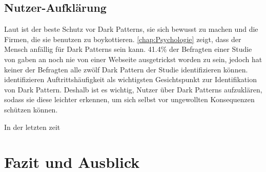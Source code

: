 \documentclass[conference,compsoc,final,a4paper]{IEEEtran}
\begin{document}
\subsection{Nutzer-Aufklärung}
Laut \citeauthor{Brignull} \autocite{Brignull} ist der beste Schutz vor Dark Patterns, sie sich bewusst zu machen und die Firmen, die sie benutzen zu boykottieren. \autoref{chap:Psychologie} zeigt, dass der Mensch anfällig für Dark Patterns sein kann. 41.4\% der Befragten einer Studie von \citeauthor{M.Bhoot2020} \autocite{M.Bhoot2020} gaben an noch nie von einer Webseite ausgetrickst worden zu sein, jedoch hat keiner der Befragten alle zwölf Dark Pattern der Studie identifizieren können. \citeauthor{M.Bhoot2020} identifizieren Auftrittshäufigkeit als wichtigsten Gesichtspunkt zur Identifikation von Dark Pattern. Deshalb ist es wichtig, Nutzer über Dark Patterns aufzuklären, sodass sie diese leichter erkennen, um sich selbst vor ungewollten Konsequenzen schützen können.

In der letzten zeit 

\section{Fazit und Ausblick}



\begin{acronym}[IEEE]
\end{acronym}

\printbibliography
\end{document}
